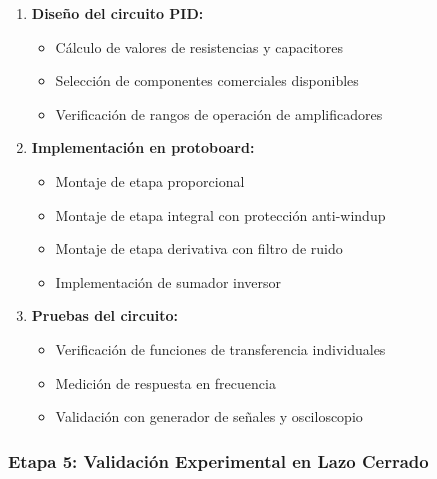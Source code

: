 \documentclass[conference]{IEEEtran}
\begin{document}
\begin{enumerate}
\item \textbf{Diseño del circuito PID:}
\begin{itemize}
\item Cálculo de valores de resistencias y capacitores
\item Selección de componentes comerciales disponibles
\item Verificación de rangos de operación de amplificadores
\end{itemize}

\item \textbf{Implementación en protoboard:}
\begin{itemize}
\item Montaje de etapa proporcional
\item Montaje de etapa integral con protección anti-windup
\item Montaje de etapa derivativa con filtro de ruido
\item Implementación de sumador inversor
\end{itemize}

\item \textbf{Pruebas del circuito:}
\begin{itemize}
\item Verificación de funciones de transferencia individuales
\item Medición de respuesta en frecuencia
\item Validación con generador de señales y osciloscopio
\end{itemize}
\end{enumerate}

\subsubsection{Etapa 5: Validación Experimental en Lazo Cerrado}
\end{document}
